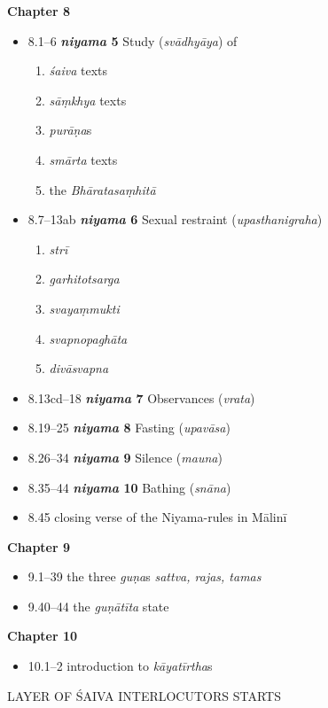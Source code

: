 \documentclass[11pt]{book} %
\newcommand{\skt}[1]{\textit{#1}}
\begin{document}
 \textbf{Chapter 8}
\begin{itemize}
\item 8.1--6 \textbf{\skt{niyama} 5}  Study (\skt{svādhyāya}) of
   \begin{enumerate}
    \item  \skt{śaiva} texts
    \item  \skt{sāṃkhya} texts
    \item  \skt{purāṇa}s
    \item  \skt{smārta} texts
    \item  the \skt{Bhāratasaṃhitā}
   \end{enumerate}
   
   \pagebreak

\item 8.7--13ab \textbf{\skt{niyama} 6}  Sexual restraint (\skt{upasthanigraha})
   \begin{enumerate}
   \item \skt{strī} 
   \item \skt{garhitotsarga} 
   \item \skt{svayaṃmukti}
   \item \skt{svapnopaghāta} 
   \item \skt{divāsvapna}
   \end{enumerate}
\item 8.13cd--18 \textbf{\skt{niyama} 7}  Observances (\skt{vrata})
\item 8.19--25 \textbf{\skt{niyama} 8}   Fasting (\skt{upavāsa})
\item 8.26--34 \textbf{\skt{niyama} 9}   Silence (\skt{mauna})
\item 8.35--44 \textbf{\skt{niyama} 10} Bathing  (\skt{snāna})
\item 8.45 closing verse of the Niyama-rules in Mālinī
\end{itemize}

 \textbf{Chapter 9}
\begin{itemize}
\item 9.1--39 the three \skt{guṇa}s \skt{sattva, rajas, tamas}
\item 9.40--44 the \skt{guṇātīta} state
\end{itemize}

 \textbf{Chapter 10}
\begin{itemize}
\item 10.1--2 introduction to \skt{kāyatīrtha}s
 \end{itemize}

   \begin{center}
LAYER OF ŚAIVA INTERLOCUTORS  STARTS
\end{center}
\end{document}
